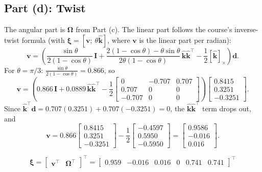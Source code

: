 \documentclass[11pt]{article}
\newcommand{\dvec}{\bm{d}}
\newcommand{\khat}{\widehat{\bm{k}}}
\newcommand{\xivec}{\bm{\xi}}
\newcommand{\vvec}{\bm{v}}
\newcommand{\Omvec}{\bm{\Omega}}
\newcommand{\skewx}[1]{\left[#1\right]_{\times}}
\begin{document}
\subsection*{Part (d): Twist}
The angular part is $\Omvec$ from Part (c). The linear part follows the course's inverse-twist formula (with $\bm{\xi} = [\vvec;\ \theta\khat]$, where $\vvec$ is the linear part per radian):
\[
    \vvec = \left(\frac{\sin\theta}{2(1 - \cos\theta)}\,\bm{I}
    + \frac{2(1 - \cos\theta) - \theta\sin\theta}{2\theta(1 - \cos\theta)}\,\khat\khat^{\intercal}
    - \frac{1}{2}\skewx{\khat}\right)\dvec .
\]
For $\theta = \pi/3$: $\frac{\sin\theta}{2(1 - \cos\theta)} = 0.866$, so
\[
    \vvec = \left(0.866\,\bm{I} + 0.0889\,\khat\khat^{\intercal}
    - \frac{1}{2}\begin{bmatrix} 0 & -0.707 & 0.707\\ 0.707 & 0 & 0\\ -0.707 & 0 & 0 \end{bmatrix}\right)
    \begin{bmatrix} 0.8415\\ 0.3251\\ -0.3251 \end{bmatrix}.
\]
Since $\khat^{\intercal}\dvec = 0.707(0.3251) + 0.707(-0.3251) = 0$, the $\khat\khat^{\intercal}$ term drops out, and
\[
    \vvec = 0.866\begin{bmatrix} 0.8415\\ 0.3251\\ -0.3251 \end{bmatrix}
    - \frac{1}{2}\begin{bmatrix} -0.4597\\ 0.5950\\ -0.5950 \end{bmatrix}
    = \begin{bmatrix} 0.9586\\ -0.016\\ 0.016 \end{bmatrix}.
\]
\begin{result}
\[
    \xivec = \begin{bmatrix}\vvec^{\intercal} & \Omvec^{\intercal}\end{bmatrix}^{\intercal}
    =\begin{bmatrix} 0.959 & -0.016 & 0.016 & 0 & 0.741 & 0.741 \end{bmatrix}^{\intercal}
\]
\end{result}



\newpage
\end{document}
